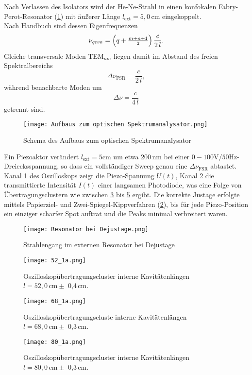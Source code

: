 Nach Verlassen des Isolators wird der He-Ne-Strahl in einen konfokalen Fabry-Perot-Resonator (\cref{fig:Spektrumanalysator}) mit äußerer Länge $l_{\mathrm{ext}} = 5{,}0\,\si{\centi\meter}$ eingekoppelt. \\
Nach Handbuch \cite{praktikum} sind dessen Eigenfrequenzen
\begin{equation}
  \nu_{qnm}
  = \Bigl(q + \tfrac{m+n+1}{2}\Bigr)\,\frac{c}{2\,l}.
\end{equation}
Gleiche transversale Moden TEM$_{nm}$ liegen damit im Abstand des freien Spektralbereichs
\begin{equation*}
  \Delta\nu_{\mathrm{FSR}}
  = \frac{c}{2\,l},
\end{equation*}
während benachbarte Moden um
\begin{equation*}
  \Delta\nu
  = \frac{c}{4\,l}
\end{equation*}
getrennt sind.
\begin{figure}[htbp]
  \centering
  \texttt{[image: Aufbaus zum optischen Spektrumanalysator.png]}
  \caption{Schema des Aufbaus zum optischen Spektrumanalysator \cite{praktikum}}
  \label{fig:Spektrumanalysator}
\end{figure}

Ein Piezoaktor verändert $l_{\mathrm{ext}} = 5 \si{\cm}$ um etwa $200\,\si{\nm}$ bei einer $0-100 \si{\volt}  $/$50 \si{\hertz}$-Dreiecksspannung, so dass ein vollständiger Sweep genau eine $\Delta\nu_{\mathrm{FSR}}$ abtastet. 
Kanal 1 des Oszilloskops zeigt die Piezo-Spannung $U(t)$, Kanal 2 die transmittierte Intensität $I(t)$ einer langsamen Photodiode, was eine Folge von Übertragungsclustern wie zwischen \cref{fig:9a} bis \cref{fig:9c} ergibt. 
Die korrekte Justage erfolgte mittels Papierziel- und Zwei-Spiegel-Kippverfahren (\cref{fig:Resonator}), bis für jede Piezo-Position ein einziger scharfer Spot auftrat und die Peaks minimal verbreitert waren.
\begin{figure}[htbp]
  \centering
  \texttt{[image: Resonator bei Dejustage.png]}
  \caption{Strahlengang im externen Resonator bei Dejustage \cite{praktikum}}
  \label{fig:Resonator}
\end{figure}
\begin{figure}[htbp]
    \centering
    \texttt{[image: 52\_1a.png]}
     \caption{Oszilloskopübertragungscluster interne Kavitätenlängen $l = 52,0\,\si{\centi\meter} \pm$ 0{,}4\,\si{\centi\meter}.}
    \label{fig:9a}
\end{figure}
  \begin{figure}[htbp]
    \centering
    \texttt{[image: 68\_1a.png]}
     \caption{Oszilloskopübertragungscluste interne Kavitätenlängen $l = 68,0\,\si{\centi\meter} \pm$ 0{,}3\,\si{\centi\meter}.}
    \label{fig:9b}
  \end{figure}
  \newpage
  \begin{figure}[htbp]
    \centering
    \texttt{[image: 80\_1a.png]}
     \caption{Oszilloskopübertragungscluster interne Kavitätenlängen $l = 80,0\,\si{\centi\meter} \pm$ 0{,}3\,\si{\centi\meter}.}
    \label{fig:9c}
  \end{figure}
 
